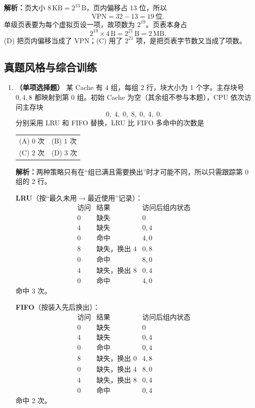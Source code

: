 \begin{enumerate}[leftmargin=*]
\ifshowsolutions\par\noindent\textbf{解析：}页大小 $8\,\mathrm{KB}=2^{13}\,\mathrm{B}$，页内偏移占 13 位，所以
\[
\text{VPN}=32-13=19\ \text{位}.
\]
单级页表要为每个虚拟页设一项，故项数为 $2^{19}$。页表本身占
\[
2^{19}\times 4\,\mathrm{B}=2^{21}\,\mathrm{B}=2\,\mathrm{MB}.
\]
(D) 把页内偏移当成了 VPN；(C) 用了 $2^{21}$ 项，是把页表字节数又当成了项数。\else \answerarea \fi

\end{enumerate}

\subsection{真题风格与综合训练}

\begin{enumerate}[leftmargin=*]

\item \textbf{（单项选择题）} 某 Cache 有 4 组，每组 2 行，块大小为 1 个字。主存块号 $0,4,8$ 都映射到第 0 组。初始 Cache 为空（其余组不参与本题），CPU 依次访问主存块
\[
0,\;4,\;0,\;8,\;0,\;4,\;0 .
\]
分别采用 LRU 和 FIFO 替换，LRU 比 FIFO 多命中的次数是

\begin{center}
\begin{tabular}{ll}
(A) $0$ 次 & (B) $1$ 次 \\[4pt]
(C) $2$ 次 & (D) $3$ 次
\end{tabular}
\end{center}

\ifshowsolutions\par\noindent\textbf{解析：}两种策略只有在“组已满且需要换出”时才可能不同，所以只需跟踪第 0 组的 2 行。

\textbf{LRU}（按“最久未用$\to$最近使用”记录）：
\[
\begin{array}{c|c|c}
\text{访问} & \text{结果} & \text{访问后组内状态}\\ \hline
0 & \text{缺失} & 0\\
4 & \text{缺失} & 0,4\\
0 & \text{命中} & 4,0\\
8 & \text{缺失，换出 }4 & 0,8\\
0 & \text{命中} & 8,0\\
4 & \text{缺失，换出 }8 & 0,4\\
0 & \text{命中} & 4,0
\end{array}
\]
命中 3 次。

\textbf{FIFO}（按装入先后换出）：
\[
\begin{array}{c|c|c}
\text{访问} & \text{结果} & \text{访问后组内状态}\\ \hline
0 & \text{缺失} & 0\\
4 & \text{缺失} & 0,4\\
0 & \text{命中} & 0,4\\
8 & \text{缺失，换出 }0 & 4,8\\
0 & \text{缺失，换出 }4 & 8,0\\
4 & \text{缺失，换出 }8 & 0,4\\
0 & \text{命中} & 0,4
\end{array}
\]
命中 2 次。


\end{enumerate}

